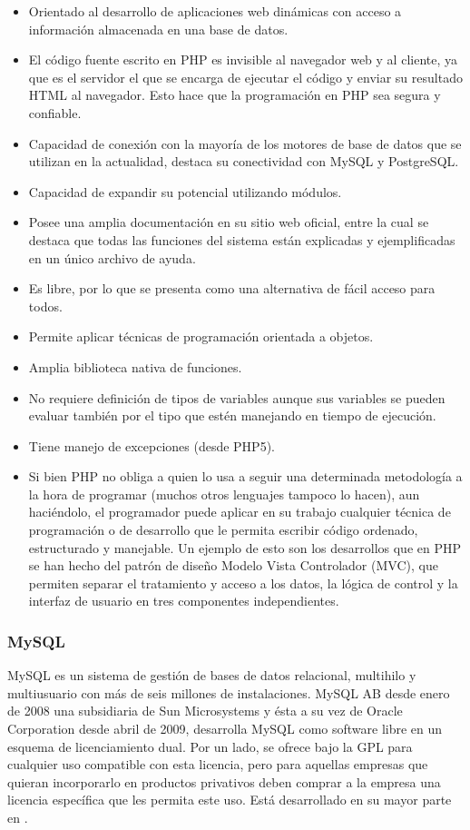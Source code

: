 \begin{itemize}
\item Orientado al desarrollo de aplicaciones web dinámicas con acceso a información almacenada en una base de datos.
\item El código fuente escrito en PHP es invisible al navegador web y al cliente, ya que es el servidor el que se encarga de ejecutar el código y enviar su resultado HTML al navegador. Esto hace que la programación en PHP sea segura y confiable.
\item Capacidad de conexión con la mayoría de los motores de base de datos que se utilizan en la actualidad, destaca su conectividad con MySQL y PostgreSQL.
\item Capacidad de expandir su potencial utilizando módulos.
\item Posee una amplia documentación en su sitio web oficial, entre la cual se destaca que todas las funciones del sistema están explicadas y ejemplificadas en un único archivo de ayuda.
\item Es libre, por lo que se presenta como una alternativa de fácil acceso para todos.
\item Permite aplicar técnicas de programación orientada a objetos.
\item Amplia biblioteca nativa de funciones.
\item No requiere definición de tipos de variables aunque sus variables se pueden evaluar también por el tipo que estén manejando en tiempo de ejecución.
\item Tiene manejo de excepciones (desde PHP5).
\item Si bien PHP no obliga a quien lo usa a seguir una determinada metodología a la hora de programar (muchos otros lenguajes tampoco lo hacen), aun haciéndolo, el programador puede aplicar en su trabajo cualquier técnica de programación o de desarrollo que le permita escribir código ordenado, estructurado y manejable. Un ejemplo de esto son los desarrollos que en PHP se han hecho del patrón de diseño Modelo Vista Controlador (MVC), que permiten separar el tratamiento y acceso a los datos, la lógica de control y la interfaz de usuario en tres componentes independientes.
\end{itemize}

\subsubsection{MySQL}
	MySQL es un sistema de gestión de bases de datos relacional, multihilo y multiusuario con más de seis millones de instalaciones. MySQL AB desde enero de 2008 una subsidiaria de Sun Microsystems y ésta a su vez de Oracle Corporation desde abril de 2009, desarrolla MySQL como software libre en un esquema de licenciamiento dual. Por un lado, se ofrece bajo la  GPL para cualquier uso compatible con esta licencia, pero para aquellas empresas que quieran incorporarlo en productos privativos deben comprar a la empresa una licencia específica que les permita este uso. Está desarrollado en su mayor parte en .\\

